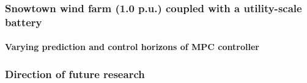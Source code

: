 \documentclass[presentation, smaller, table, svgnames]{beamer}
\begin{document}
\begin{frame}
	\frametitle{\large Snowtown wind farm (1.0 p.u.) coupled with a utility-scale battery}
	\framesubtitle{Varying prediction and control horizons of MPC controller}

	\begin{figure}[!h]
		\centering
    		\label{fig:disp_wind_bess}
		\scalebox{0.75}{
			
		}
	\end{figure}

\end{frame}


\begin{frame}
	\frametitle{Direction of future research}
	\framesubtitle{}

	
\end{frame}

\end{document}
